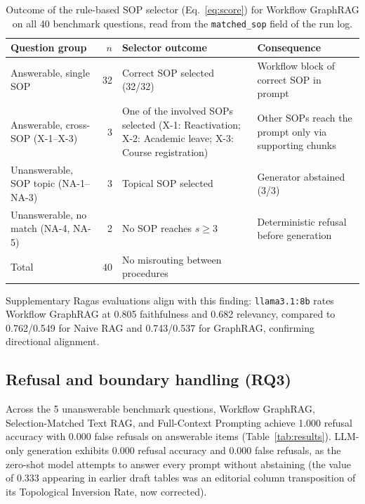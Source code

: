 \documentclass[preprint,10pt]{elsarticle}
\begin{document}
\begin{table}[!htbp]
\centering
\caption{Outcome of the rule-based SOP selector (Eq.~\eqref{eq:score}) for Workflow GraphRAG on all 40 benchmark questions, read from the \texttt{matched\_sop} field of the run log.}
\label{tab:selection}
\small
\setlength{\tabcolsep}{4pt}
\begin{tabularx}{\textwidth}{>{\raggedright\arraybackslash}p{2.7cm} r >{\raggedright\arraybackslash}X >{\raggedright\arraybackslash}p{3.0cm}}
\toprule
Question group & $n$ & Selector outcome & Consequence \\
\midrule
Answerable, single SOP & 32 & Correct SOP selected (32/32) & Workflow block of correct SOP in prompt \\
Answerable, cross-SOP (X-1--X-3) & 3 & One of the involved SOPs selected (X-1: Reactivation; X-2: Academic leave; X-3: Course registration) & Other SOPs reach the prompt only via supporting chunks \\
Unanswerable, SOP topic (NA-1--NA-3) & 3 & Topical SOP selected & Generator abstained (3/3) \\
Unanswerable, no match (NA-4, NA-5) & 2 & No SOP reaches $s \geq 3$ & Deterministic refusal before generation \\
\midrule
Total & 40 & No misrouting between procedures & \\
\bottomrule
\end{tabularx}
\end{table}

Supplementary Ragas evaluations align with this finding: \texttt{llama3.1:8b} rates Workflow GraphRAG at 0.805 faithfulness and 0.682 relevancy, compared to 0.762/0.549 for Naive RAG and 0.743/0.537 for GraphRAG, confirming directional alignment.

\subsection{Refusal and boundary handling (RQ3)}
Across the 5 unanswerable benchmark questions, Workflow GraphRAG, Selection-Matched Text RAG, and Full-Context Prompting achieve 1.000 refusal accuracy with 0.000 false refusals on answerable items (Table~\ref{tab:results}). LLM-only generation exhibits 0.000 refusal accuracy and 0.000 false refusals, as the zero-shot model attempts to answer every prompt without abstaining (the value of 0.333 appearing in earlier draft tables was an editorial column transposition of its Topological Inversion Rate, now corrected).
\end{document}
